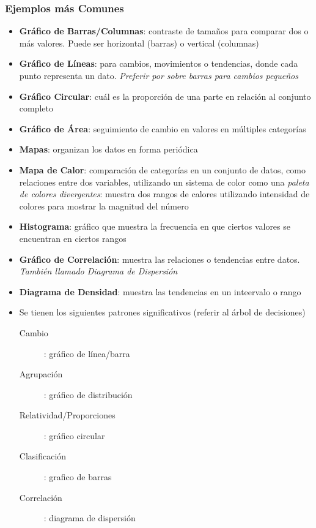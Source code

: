 \subsubsection{Ejemplos más Comunes}
\begin{itemize}
    \item {\textbf{Gráfico de Barras/Columnas}: contraste de tamaños para comparar dos o más valores. Puede ser horizontal (barras) o vertical (columnas)}
    \item {\textbf{Gráfico de Líneas}: para cambios, movimientos o tendencias, donde cada punto representa un dato. \textit{Preferir por sobre barras para cambios pequeños}}
    \item {\textbf{Gráfico Circular}: cuál es la proporción de una parte en relación al conjunto completo}
    \item {\textbf{Gráfico de Área}: seguimiento de cambio en valores en múltiples categorías}
    \item {\textbf{Mapas}: organizan los datos en forma periódica}
    \item {\textbf{Mapa de Calor}: comparación de categorías en un conjunto de datos, como relaciones entre dos variables, utilizando un sistema de color como una \textit{paleta de colores divergentes}: muestra dos rangos de calores utilizando intensidad de colores para mostrar la magnitud del número}
    \item {\textbf{Histograma}: gráfico que muestra la frecuencia en que ciertos valores se encuentran en ciertos rangos}
    \item {\textbf{Gráfico de Correlación}: muestra las relaciones o tendencias entre datos. \textit{También llamado Diagrama de Dispersión}}
    \item {\textbf{Diagrama de Densidad}: muestra las tendencias en un inteervalo o rango}
    \item {Se tienen los siguientes patrones significativos (referir al árbol de decisiones)
    \begin{description}
        \item [Cambio]{: gráfico de línea/barra}
        \item [Agrupación]{: gráfico de distribución}
        \item [Relatividad/Proporciones]{: gráfico circular}
        \item [Clasificación]{: grafico de barras}
        \item [Correlación]{: diagrama de dispersión}
    \end{description}}
\end{itemize}

